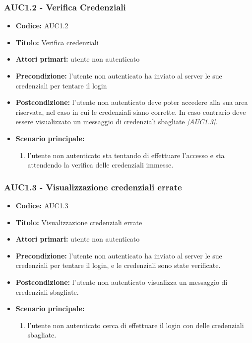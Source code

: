 \documentclass[casi-duso]{subfiles}
\begin{document}
\subsubsection{AUC1.2 - Verifica Credenziali}%
\label{subsub:AUC1.2}
\begin{itemize}
  \item \textbf{Codice:} AUC1.2
  \item \textbf{Titolo:} Verifica credenziali
  \item \textbf{Attori primari:} utente non autenticato
  \item \textbf{Precondizione:} l'utente non autenticato ha inviato al server le sue credenziali per tentare il login
  \item \textbf{Postcondizione:} l'utente non autenticato deve poter accedere alla sua area riservata, nel caso in cui le credenziali siano corrette. In caso
  contrario deve essere visualizzato un messaggio di credenziali sbagliate \emph{[AUC1.3]}.
  \item \textbf{Scenario principale:}
  \begin{enumerate}
    \item l'utente non autenticato sta tentando di effettuare l'accesso e sta attendendo la verifica delle credenziali immesse.
  \end{enumerate}
\end{itemize}

\subsubsection{AUC1.3 - Visualizzazione credenziali errate}%
\label{subsub:AUC1.3}
\begin{itemize}
  \item \textbf{Codice:} AUC1.3
  \item \textbf{Titolo:} Visualizzazione credenziali errate
  \item \textbf{Attori primari:} utente non autenticato
  \item \textbf{Precondizione:} l'utente non autenticato ha inviato al server le sue credenziali per tentare il login, e le credenziali sono state verificate.
  \item \textbf{Postcondizione:} l'utente non autenticato visualizza un messaggio di credenziali sbagliate.
  \item \textbf{Scenario principale:}
  \begin{enumerate}
    \item l'utente non autenticato cerca di effettuare il login con delle credenziali sbagliate.
  \end{enumerate}
\end{itemize}
\end{document}
